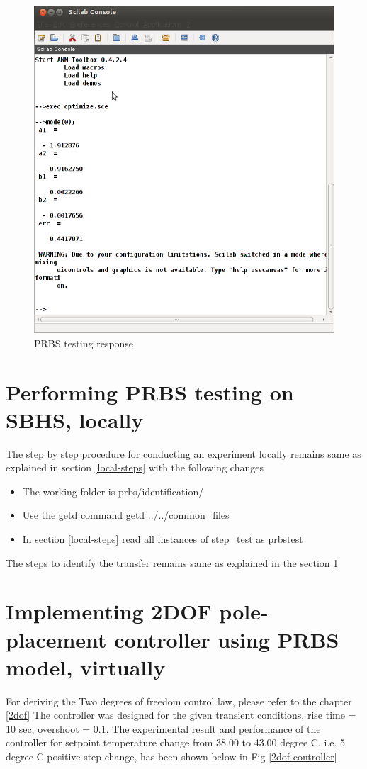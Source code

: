 \begin{figure}
\centering
\includegraphics[width=0.7\linewidth]{prbs/prbs-model.png}
\caption{PRBS testing response}
\label{prbs-model}
\end{figure}



\section{Performing PRBS testing on SBHS, locally}
The step by step procedure for conducting an experiment locally remains same as explained in section \ref{local-steps} with the following changes
\begin{itemize}
\item The working folder is prbs/identification/
\item Use the getd command getd ../../common\_files
\item In section \ref{local-steps} read all instances of step\_test as prbstest
\end{itemize}
The steps to identify the transfer remains same as explained in the section \ref{prbs-model}

\section{Implementing 2DOF pole-placement controller using PRBS model, virtually}

For deriving the Two degrees of freedom control law, please refer to the chapter \ref{2dof}
The controller was designed for the given transient conditions, rise time = 10 sec, overshoot = 0.1. The experimental result and performance of the controller for setpoint temperature change from 38.00 to 43.00 degree C, i.e. 5 degree C positive step change, has been shown below in Fig \ref{2dof-controller}

